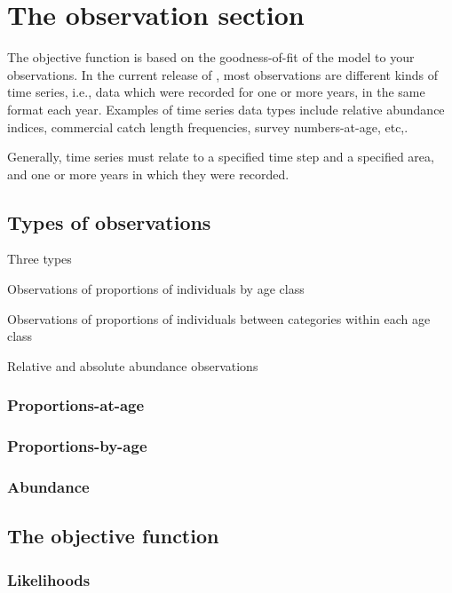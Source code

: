 \section{The observation section\label{sec:observation-section}}

The objective function is based on the goodness-of-fit of the model to your observations. In the current release of \SPM, most observations are different kinds of time series, i.e., data which were recorded for one or more years, in the same format each year. Examples of time series data types include relative abundance indices, commercial catch length frequencies, survey numbers-at-age, etc,. 

Generally, time series must relate to a specified time step and a specified area, and one or more years in which they were recorded.

\subsection{Types of observations}

Three types

\begin{description}
  \item Observations of proportions of individuals by age class
  \item Observations of proportions of individuals between categories within each age class
  \item Relative and absolute abundance observations
\end{description}

\subsubsection{Proportions-at-age}

\subsubsection{Proportions-by-age}

\subsubsection{Abundance}

\subsection{The objective function}

\subsubsection{Likelihoods}

